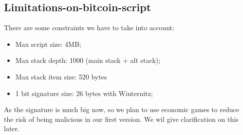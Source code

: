 \subsection{Limitations-on-bitcoin-script}

There are some constraints we have to take into account:
\begin{itemize}
    \item Max script size: 4MB;
    \item Max stack depth: 1000 (main stack + alt stack);
    \item Max stack item size: 520 bytes
    \item 1 bit signature size: 26 bytes with Winternitz;
\end{itemize}

As the signature is much big now, so we plan to use economic games to reduce the risk of being malicious in our first version.
We wil give clarification on this later.
